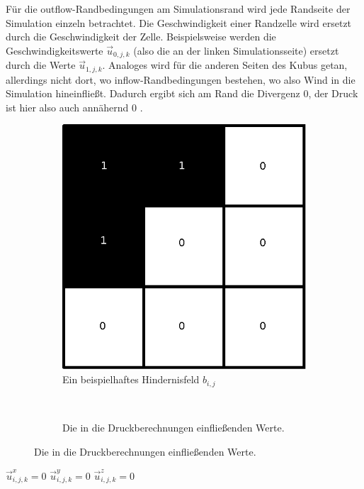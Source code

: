 Für die outflow-Randbedingungen am Simulationsrand wird jede Randseite der
Simulation einzeln betrachtet. Die Geschwindigkeit einer Randzelle wird ersetzt
durch die Geschwindigkeit der  Zelle.
Beispielsweise werden die Geschwindigkeitswerte $\vec{u}_{0,j,k}$ (also die an
der linken Simulationsseite) ersetzt durch die Werte $\vec{u}_{1,j,k}$. Analoges
wird für die anderen Seiten des Kubus getan, allerdings nicht dort, wo
inflow-Randbedingungen bestehen, wo also Wind in die Simulation hineinfließt.
Dadurch ergibt sich am Rand die Divergenz 0, der Druck ist hier also auch
annähernd 0 .

\begin{figure}[ht]
	\begin{subfigure}[b]{0.5\textwidth}
		\centering
		\includegraphics[width=\textwidth]{images/boundary_field_for_pressure}
		\caption{Ein beispielhaftes Hindernisfeld $b_{i,j}$}
	\end{subfigure}
	~
	\begin{subfigure}[b]{0.5\textwidth}
		\centering
		\def\svgwidth{\textwidth}
		
		\caption{Die in die Druckberechnungen einfließenden Werte.}
	\label{fig:stam_modified_jacobi_algorithm}
	\end{subfigure}
\end{figure}

\begin{algorithm}
\caption{Die abschließende Randbedingungserzwingung}
\begin{algorithmic}
			\State $\vec{u}_{i,j,k}^x = 0$
		\EndIf
			\State $\vec{u}_{i,j,k}^y = 0$
		\EndIf
			\State $\vec{u}_{i,j,k}^z = 0$
		\EndIf
	\EndFor
\EndFunction
\end{algorithmic}
\label{alg:stam_enforce_free_slip}
\end{algorithm}
